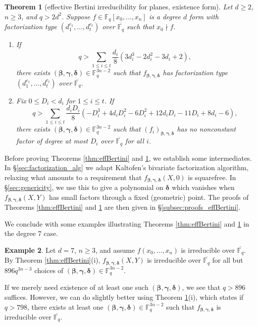 \documentclass{amsart}
\newcommand{\F}{\mathbb{F}}
\renewcommand{\v}{\beta}
\newcommand{\w}{\gamma}
\newcommand{\z}{\delta}
\newcommand{\bv}{\boldsymbol{\v}}
\newcommand{\bw}{\boldsymbol{\w}}
\newcommand{\bz}{\boldsymbol{\z}}
\newcommand{\fvwz}{f_{\bv, \bw, \bz}}
\newtheorem{theorem}{Theorem}[section]
\theoremstyle{definition}
\newtheorem{example}[theorem]{Example}
\numberwithin{equation}{section}
\numberwithin{table}{section}
\newcommand{\qbound}[1]{{\color{cyan}$q > {#1}$}}
\renewcommand{\qbound}[1]{{$q > {#1}$}}
\begin{document}
\begin{theorem}[effective Bertini irreducibility for planes, existence form]
\label{thm:effBertini_existence}
	Let $d \geq 2$, $n \geq 3$, and \qbound{2d^2}. Suppose $f \in \F_q[x_0,\ldots,x_n]$ is a degree $d$ form with factorization type $(d_1^{e_1},\ldots,d_t^{e_t})$ over $\overline{\F_q}$ such that $x_0 \nmid f$.
	
	\begin{enumerate}[label = (\roman*)]
		\item If 
		\[q > \sum_{1 \leq i \leq t} \frac{d_i}{8}\left(3d_i^3 - 2d_i^2 - 3d_i + 2\right),\]
		there exists $(\bv,\bw,\bz) \in \F_q^{3n-2}$ such that $\fvwz$ has factorization type $(d_1^{e_1},\ldots,d_t^{e_t})$ over $\overline{\F_q}$.
		
		\item Fix $0 \leq D_i < d_i$ for $1 \leq i \leq t$. If
        \[q > \sum_{1 \leq i \leq t} \frac{d_iD_i}{8}\left(-D_i^3 + 4d_iD_i^2 - 6D_i^2 + 12d_iD_i - 11D_i + 8d_i - 6\right),\]
        there exists $(\bv,\bw,\bz) \in \F_q^{3n-2}$ such that $(f_i)_{\bv,\bw,\bz}$ has no nonconstant factor of degree at most $D_i$ over $\overline{\F_q}$ for all $i$.
	\end{enumerate}
\end{theorem}

Before proving Theorems \ref{thm:effBertini} and \ref{thm:effBertini_existence}, we establish some intermediates. In \S \ref{sec:factorization_alg} we adapt Kaltofen's bivariate factorization algorithm, relaxing what amounts to a requirement that $\fvwz(X,0)$ is squarefree. In \S \ref{sec:genericity}, we use this to give a polynomial on $\bz$ which vanishes when $\fvwz(X,Y)$ has small factors through a fixed (geometric) point. The proofs of Theorems \ref{thm:effBertini} and \ref{thm:effBertini_existence} are then given in \S \ref{subsec:proofs_effBertini}. 

We conclude with some examples illustrating Theorems \ref{thm:effBertini} and \ref{thm:effBertini_existence} in the degree 7 case.

\begin{example}
\label{ex:deg7_irr}
    Let $d=7$, $n \geq 3$, and assume $f(x_0, \ldots, x_n)$ is irreducible over $\overline{\F_q}$. By Theorem \ref{thm:effBertini}(i), $\fvwz(X,Y)$ is irreducible over $\overline{\F_q}$ for all but $896q^{3n-3}$ choices of $(\bv,\bw,\bz) \in \F_q^{3n-2}$. 
    
    If we merely need existence of at least one such $(\bv,\bw,\bz)$, we see that \qbound{896} suffices. However, we can do slightly better using Theorem \ref{thm:effBertini_existence}(i), which states if \qbound{798}, there exists at least one $(\bv,\bw,\bz) \in \F_q^{3n-2}$ such that $\fvwz$ is irreducible over $\overline{\F_q}$.
\end{example}
\end{document}
